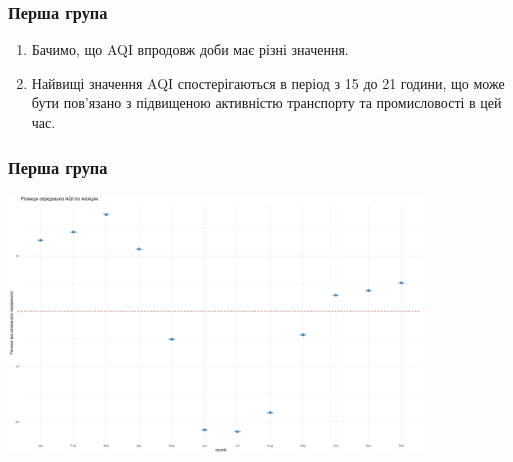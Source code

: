 \documentclass{beamer}
\begin{document}
\begin{frame}
  \frametitle{Перша група}

  \begin{enumerate}
    \item Бачимо, що AQI впродовж доби має різні значення.
    \item Найвищі значення AQI спостерігаються в період з 15 до 21 години, 
    що може бути пов'язано з підвищеною активністю транспорту та промисловості в цей час.
  
  \end{enumerate}
\end{frame}

\begin{frame}
  \frametitle{Перша група}

  \begin{center}
    \includegraphics[height=2.7in]{./plots/lab2/1-4-part/seasonal_summary.png}
  \end{center}

\end{frame}
\end{document}
